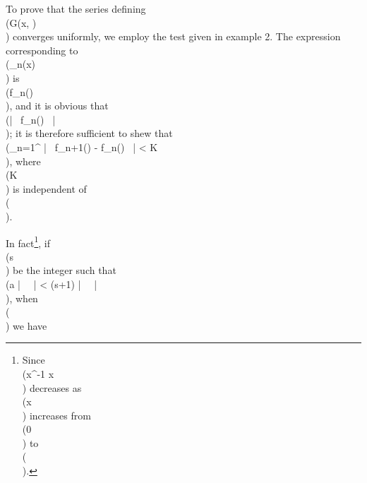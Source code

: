 To prove that the series defining \\(G(x, \alpha)\\) converges uniformly, we
employ the test given in  example 2. %
The expression corresponding to \\(\omega_{n}(x)\\) is
\\(f_{n}(\alpha)\\), and it is obvious that
\\(\left| \, f_{n}(\alpha) \, \right|  \\); it is therefore sufficient to shew
that
\\(\sum_{n=1}^{\infty} \left| \, f_{n+1}(\alpha) - f_{n}(\alpha) \, \right|  < K\\),
where \\(K\\) is independent of \\(\alpha\\).

In fact\footnote{Since \\(x^{-1} \sin x\\) decreases as \\(x\\) increases from \\(0\\) to \\(\pi\\).},
if \\(s\\) be the integer such that
\\(a \left| \, \alpha \, \right|  \leq \pi < (s+1) \left| \, \alpha \, \right| \\),
when \\(\alpha {}\\) we have
\\[ 
\sum_{n=1}^{s-1}
\left| \, 
  f_{n+1}(\alpha) - f_{n}(\alpha)
 \, \right| 
=
\sum_{n=1}^{s-1}
(
f_{n}(\alpha)
??? %
f_{n+1}(\alpha)
)
=
\frac{ \sin^{2} \alpha }{\alpha^{2}}
-
\frac{ \sin^{2} s\alpha }{s^{2} \alpha^{2}}.
\\] 
%
%

